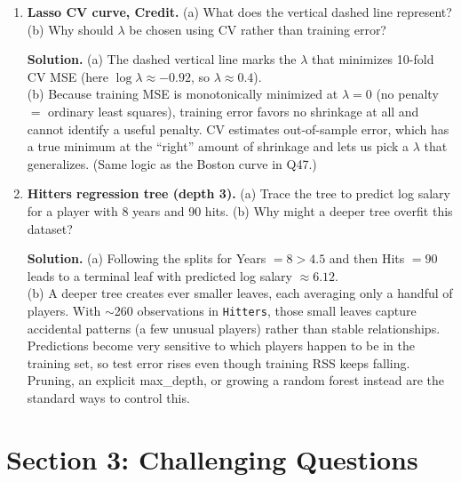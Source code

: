 \documentclass[11pt]{article}
\newcommand{\solution}[1]{%
  \par\medskip\noindent\textbf{Solution.} #1\par\medskip
}
\begin{document}
\begin{enumerate}[leftmargin=*]
\item \textbf{Lasso CV curve, Credit.} (a) What does the vertical dashed line represent? (b) Why should $\lambda$ be chosen using CV rather than training error?

\solution{(a) The dashed vertical line marks the $\lambda$ that minimizes 10-fold CV MSE (here $\log\lambda \approx -0.92$, so $\lambda \approx 0.4$).\\
(b) Because training MSE is monotonically minimized at $\lambda = 0$ (no penalty $=$ ordinary least squares), training error favors no shrinkage at all and cannot identify a useful penalty. CV estimates out-of-sample error, which has a true minimum at the ``right'' amount of shrinkage and lets us pick a $\lambda$ that generalizes. (Same logic as the Boston curve in Q47.)}

\item \textbf{Hitters regression tree (depth 3).} (a) Trace the tree to predict log salary for a player with 8 years and 90 hits. (b) Why might a deeper tree overfit this dataset?

\solution{(a) Following the splits for Years $= 8 > 4.5$ and then Hits $= 90$ leads to a terminal leaf with predicted log salary $\approx \mathbf{6.12}$.\\
(b) A deeper tree creates ever smaller leaves, each averaging only a handful of players. With $\sim$260 observations in \texttt{Hitters}, those small leaves capture accidental patterns (a few unusual players) rather than stable relationships. Predictions become very sensitive to which players happen to be in the training set, so test error rises even though training RSS keeps falling. Pruning, an explicit max\_depth, or growing a random forest instead are the standard ways to control this.}

\end{enumerate}


\newpage
\section*{Section 3: Challenging Questions}
\end{document}
